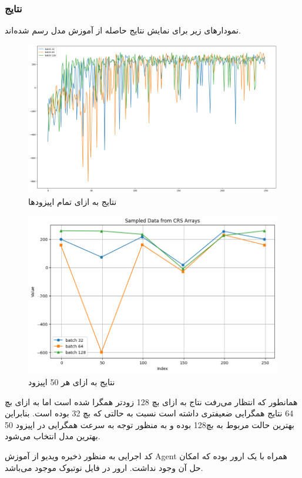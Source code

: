 \documentclass{article}
\begin{document}
\subsubsection{نتایج}
نمودارهای زیر برای نمایش نتایج حاصله از آموزش مدل رسم شده‌اند.
\begin{figure}[H]
\centering
\includegraphics[width=1.0\linewidth]{img/result1}
\caption{نتایج به ازای تمام اپیزودها}
\label{fig:result1}
\end{figure}
\begin{figure}[H]
\centering
\includegraphics[width=1.0\linewidth]{img/result2}
\caption{نتایج به ازای هر 50 اپیزود}
\label{fig:result2}
\end{figure}
همانطور که انتظار می‌رفت نتاج به ازای بچ 128 زودتر همگرا شده است اما به ازای بچ 64 نتایج همگرایی ضعیفتری داشته است نسبت به حالتی که بچ 32 بوده است. بنابراین بهترین حالت مربوط به بچ128 بوده و به منظور توجه به سرعت همگرایی در اپیزود 50 بهترین مدل انتخاب می‌شود.

کد اجرایی به منظور ذخیره ویدیو از آموزش Agent همراه با یک ارور بوده که امکان حل آن وجود نداشت. ارور در فایل نوتبوک موجود می‌باشد.
\end{document}
